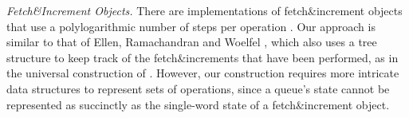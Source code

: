 \emph{Fetch\&Increment Objects.}
There are implementations of fetch\&increment objects that use a polylogarithmic number of steps per operation \cite{ERW12,10.1007/978-3-642-41527-2_20}.
Our approach is similar to that of Ellen, Ramachandran and Woelfel \cite{ERW12},
which also uses a tree structure to keep track of the fetch\&increments
that have been performed, as in the universal construction of \cite{DBLP:conf/stoc/AfekDT95}.
However, our construction requires more intricate
data structures to represent sets of operations, since a queue's state cannot be represented as succinctly
as the single-word state of a fetch\&increment object.

